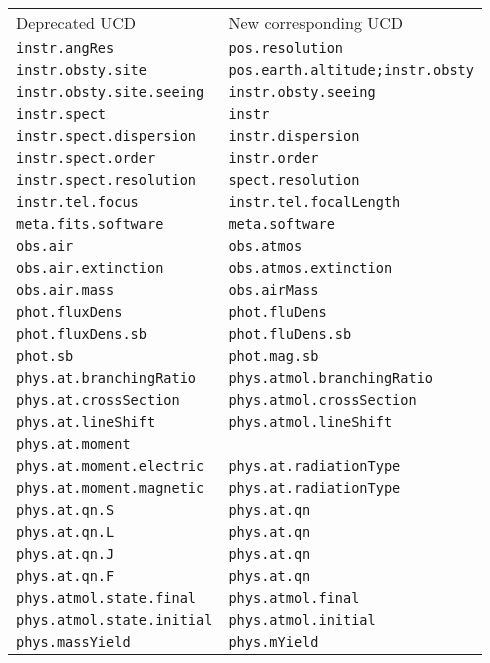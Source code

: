 \documentclass[11pt,a4paper]{ivoa}
\begin{document}
\begin{enumerate}
\begin{longtable}{|l|l|}
\sptablerule
Deprecated UCD & New corresponding UCD\\
\sptablerule
{\tt instr.angRes} & {\tt pos.resolution}\\
{\tt instr.obsty.site} & {\tt pos.earth.altitude;instr.obsty}\\ 
{\tt instr.obsty.site.seeing} & {\tt instr.obsty.seeing}\\
{\tt instr.spect} & {\tt instr}\\
{\tt instr.spect.dispersion} & {\tt instr.dispersion}\\
{\tt instr.spect.order} & {\tt instr.order}\\
{\tt instr.spect.resolution} & {\tt spect.resolution}\\
{\tt instr.tel.focus} & {\tt instr.tel.focalLength}\\
{\tt meta.fits.software} & {\tt meta.software }\\
{\tt obs.air} & {\tt obs.atmos}\\
{\tt obs.air.extinction} & {\tt obs.atmos.extinction}\\
{\tt obs.air.mass} & {\tt obs.airMass}\\
{\tt phot.fluxDens} & {\tt phot.fluDens}\\
{\tt phot.fluxDens.sb} & {\tt phot.fluDens.sb}\\ 
{\tt phot.sb} & {\tt phot.mag.sb}\\
{\tt phys.at.branchingRatio} & {\tt phys.atmol.branchingRatio}\\
{\tt phys.at.crossSection} & {\tt phys.atmol.crossSection}\\
{\tt phys.at.lineShift} & {\tt phys.atmol.lineShift}\\
{\tt phys.at.moment} & \\
{\tt phys.at.moment.electric} & {\tt phys.at.radiationType}\\ 
{\tt phys.at.moment.magnetic} & {\tt phys.at.radiationType}\\
{\tt phys.at.qn.S} & {\tt phys.at.qn}\\
{\tt phys.at.qn.L} & {\tt phys.at.qn}\\
{\tt phys.at.qn.J} & {\tt phys.at.qn}\\
{\tt phys.at.qn.F} & {\tt phys.at.qn}\\
{\tt phys.atmol.state.final} & {\tt  phys.atmol.final}\\
{\tt phys.atmol.state.initial} & {\tt phys.atmol.initial}\\
{\tt phys.massYield} & {\tt phys.mYield}\\

\end{longtable}
\end{enumerate}
\end{document}
